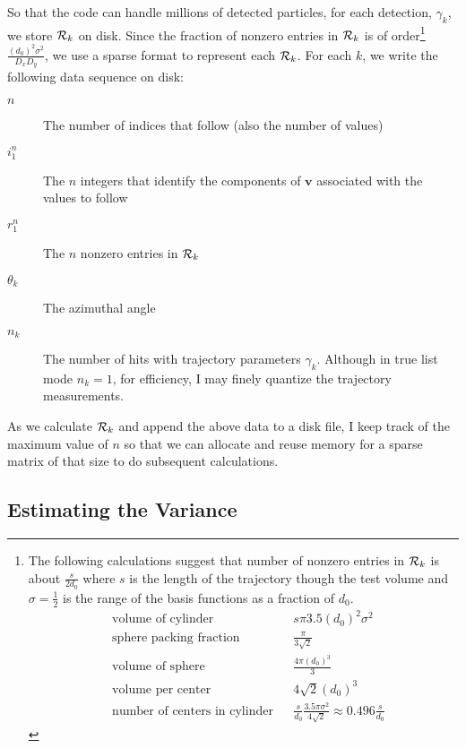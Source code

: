 \documentclass[twocolumn]{article}
\newcommand{\Radon}{{\cal R}}
\newcommand{\av}{\mathbf{v}}%
\begin{document}
So that the code can handle millions of detected particles, for each
detection, $\gamma_k$, we store $\Radon_k$ on disk.  Since the fraction
of nonzero entries in $\Radon_k$ is of order\footnote{The following
  calculations suggest that number of nonzero entries in $\Radon_k$ is
  about $\frac{s}{2d_0}$ where $s$ is the length of the trajectory
  though the test volume and $\sigma=\frac{1}{2}$ is the range of the
  basis functions as a fraction of $d_0$.
  \begin{align*}
    &\text{volume of cylinder} && s \pi 3.5 (d_0)^2 \sigma^2 \\
    &\text{sphere packing fraction} && \frac{\pi}{3\sqrt{2}} \\
    &\text{volume of sphere} && \frac{4\pi (d_0)^3}{3} \\
    &\text{volume per center} && 4\sqrt{2}(d_0)^3 \\
    &\text{number of centers in cylinder} && \frac{s}{d_0} \frac{3.5
      \pi \sigma^2}{4\sqrt{2}} \approx 0.496 \frac{s}{d_0}
  \end{align*}
}
$\frac{(d_0)^2\sigma^2}
{D_xD_y}$, we use a sparse format to represent each $\Radon_k$.  For
each $k$, we write the following data sequence on disk:
\begin{description}
\item[$n$] The number of indices that follow (also the number of values)
\item[$i_1^n$] The $n$ integers that identify the components of
  $\av$ associated with the values to follow
\item[$r_1^n$] The $n$ nonzero entries in $\Radon_k$
\item[$\theta_k$] The azimuthal angle
\item[$n_k$] The number of hits with trajectory parameters
  $\gamma_k$.  Although in true list mode $n_k = 1$, for efficiency, I
  may finely quantize the trajectory measurements.
\end{description}
As we calculate $\Radon_k$ and append the above data to a disk file, I
keep track of the maximum value of $n$ so that we can allocate and
reuse memory for a sparse matrix of that size to do subsequent
calculations.

\subsection{Estimating the Variance}
\label{sec:variance}
\end{document}
